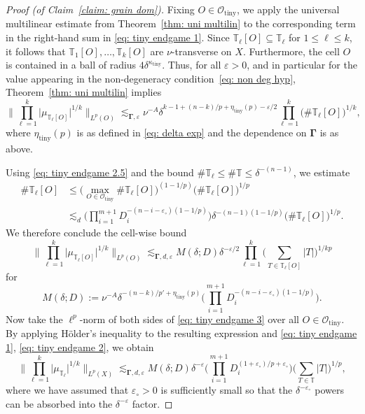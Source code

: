 \documentclass[reqno]{amsart}
\numberwithin{equation}{section}
\newcommand{\T}{\mathbb{T}}
\newcommand{\cO}{\mathcal{O}}
\newcommand{\bdGamma}{\boldsymbol{\Gamma}}
\theoremstyle{plain}
\theoremstyle{definition}
\newcommand{\ttiny}{\mathrm{tiny}}
\begin{document}
\begin{proof}[Proof (of Claim~\ref{claim: grain dom})]
Fixing $O \in \cO_{\ttiny}$, we apply the universal multilinear estimate from Theorem~\ref{thm: uni multilin} to the corresponding term in the right-hand sum in \eqref{eq: tiny endgame 1}. Since $\T_{\ell}[O] \subseteq \T_{\ell}$ for $1 \leq \ell \leq k$, it follows that $\T_1[O], \dots, \T_k[O]$ are $\nu$-transverse on $X$. Furthermore, the cell $O$ is contained in a ball of radius $4\delta^{\kappa_{\ttiny}}$. Thus, for all $\varepsilon > 0$, and in particular for the value appearing in the non-degeneracy condition~\eqref{eq: non deg hyp}, Theorem~\ref{thm: uni multilin} implies
\begin{equation*}
    \Big\|\prod_{\ell = 1}^k \big| \mu_{\T_{\ell}[O]} \big|^{1/k} \Big\|_{L^p(O)} \lesssim_{\bdGamma, \varepsilon} \nu^{-A}  \delta^{k - 1 + (n - k)/p + \eta_{\ttiny}(p) - \varepsilon/2}\prod_{\ell = 1}^k \big(\#\T_{\ell}[O]\big)^{1/k},
\end{equation*}
where $\eta_{\ttiny}(p)$ is as defined in \eqref{eq: delta exp} and the dependence on $\bdGamma$ is as above. 

Using \eqref{eq: tiny endgame 2.5} and the bound $\#\T_{\ell} \leq \#\T \leq \delta^{-(n-1)}$, we estimate
\begin{align*}
    \#\T_{\ell}[O] &\leq \big(\max_{O \in \cO_{\ttiny}}\#\T_{\ell}[O]\big)^{(1-1/p)}\big(\#\T_{\ell}[O]\big)^{1/p}\\
    &\lesssim_d \Big(\prod_{i=1}^{m+1} D_i^{-(n - i -\varepsilon_{\circ})(1-1/p)}\Big) \delta^{-(n-1)(1-1/p)} \big(\#\T_{\ell}[O]\big)^{1/p}.
\end{align*}
We therefore conclude the cell-wise bound
\begin{equation}\label{eq: tiny endgame 3}
    \Big\|\prod_{\ell = 1}^k \big| \mu_{\T_{\ell}[O]} \big|^{1/k} \Big\|_{L^p(O)} \lesssim_{\bdGamma, d,  \varepsilon}  M(\delta; D) \delta^{-\varepsilon/2} \prod_{\ell=1}^k\Big(\sum_{T \in \T_{\ell}[O]} |T| \Big)^{1/kp}
\end{equation}
for
\begin{equation*}
   M(\delta; D) :=    \nu^{-A} \delta^{-(n-k)/p' + \eta_{\ttiny}(p)}\Big(\prod_{i=1}^{m+1} D_i^{-(n - i -\varepsilon_{\circ})(1-1/p)}\Big).
\end{equation*}
Now take the $\ell^p$-norm of both sides of \eqref{eq: tiny endgame 3} over all $O \in \cO_{\ttiny}$. By applying H\"older's inequality to the resulting expression and \eqref{eq: tiny endgame 1},  \eqref{eq: tiny endgame 2}, we obtain
\begin{equation*}
   \Big\|\prod_{\ell = 1}^k \big| \mu_{\T_{\ell}} \big|^{1/k} \Big\|_{L^p(X)} \lesssim_{\bdGamma, d,  \varepsilon}  M(\delta; D) \delta^{-\varepsilon}\big(\prod_{i=1}^{m+1}  D_i^{(1 + \varepsilon_{\circ})/p + \varepsilon_{\circ}}\Big) \Big(\sum_{T \in \T} |T| \Big)^{1/p},
\end{equation*}
where we have assumed that $\varepsilon_{\circ} > 0$ is sufficiently small so that the $\delta^{-\varepsilon_{\circ}}$ powers can be absorbed into the $\delta^{-\varepsilon}$ factor.


\end{proof}
\end{document}
